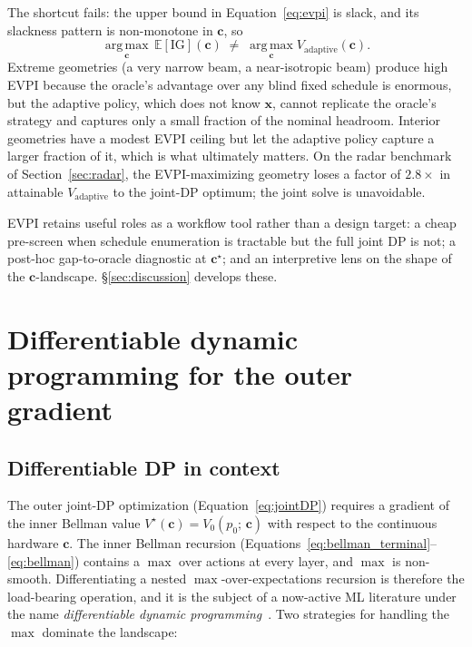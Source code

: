\documentclass[11pt,a4paper,onecolumn]{article}
\newcommand{\E}{\mathbb{E}}
\newcommand{\argmax}{\operatorname*{arg\,max}}
\newcommand{\bx}{\bm{x}}
\newcommand{\bc}{\bm{c}}
\begin{document}
The shortcut fails: the upper bound in Equation~\eqref{eq:evpi} is slack, and its slackness pattern is non-monotone in $\bc$, so
\begin{equation}
\argmax_{\bc} \,\E[\mathrm{IG}](\bc) \;\ne\; \argmax_{\bc} V_{\text{adaptive}}(\bc).
\label{eq:argmax_mismatch}
\end{equation}
Extreme geometries (a very narrow beam, a near-isotropic beam) produce high EVPI because the oracle's advantage over any blind fixed schedule is enormous, but the adaptive policy, which does not know $\bx$, cannot replicate the oracle's strategy and captures only a small fraction of the nominal headroom.  Interior geometries have a modest EVPI ceiling but let the adaptive policy capture a larger fraction of it, which is what ultimately matters.  On the radar benchmark of Section~\ref{sec:radar}, the EVPI-maximizing geometry loses a factor of $2.8\times$ in attainable $V_{\text{adaptive}}$ to the joint-DP optimum; the joint solve is unavoidable.

EVPI retains useful roles as a workflow tool rather than a design target: a cheap pre-screen when schedule enumeration is tractable but the full joint DP is not; a post-hoc gap-to-oracle diagnostic at $\bc^\star$; and an interpretive lens on the shape of the $\bc$-landscape.  §\ref{sec:discussion} develops these.

\section{Differentiable dynamic programming for the outer gradient}
\label{sec:envelope}

\subsection{Differentiable DP in context}
\label{sec:diffdp_context}

The outer joint-DP optimization (Equation~\eqref{eq:jointDP}) requires a gradient of the inner Bellman value $V^\star(\bc) = V_0(p_0;\, \bc)$ with respect to the continuous hardware $\bc$.  The inner Bellman recursion (Equations~\eqref{eq:bellman_terminal}--\eqref{eq:bellman}) contains a $\max$ over actions at every layer, and $\max$ is non-smooth.  Differentiating a nested $\max$-over-expectations recursion is therefore the load-bearing operation, and it is the subject of a now-active ML literature under the name \emph{differentiable dynamic programming}~\cite{mensch2018differentiable, amos2018mpc, domke2012generic, blondel2022efficient}.  Two strategies for handling the $\max$ dominate the landscape:
\end{document}
